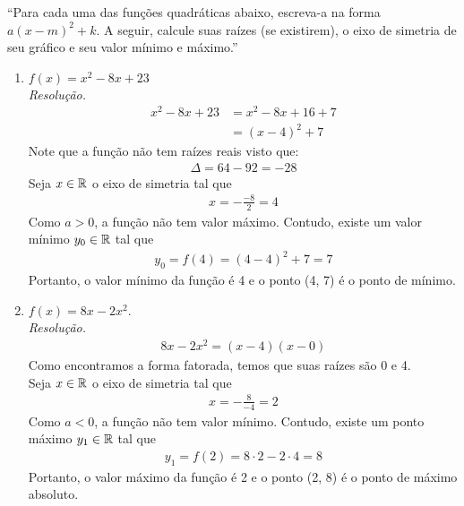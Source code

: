 \enquote{Para cada uma das funções quadráticas abaixo, escreva-a na forma $a(x - m)^2 + k$. A seguir, calcule suas raízes (se existirem), o eixo de simetria de seu gráfico e seu valor mínimo e máximo.}
\begin{enumerate}
    \item $f(x) = x^2 - 8x + 23$ \\
    \emph{Resolução.}
    \begin{align*}
        x^2 - 8x + 23 & = x^2 - 8x + 16 + 7 \\ & =
        (x - 4)^2 + 7
    \end{align*}
    Note que a função não tem raízes reais visto que:
    \begin{align*}
        \Delta = 64 - 92 = -28
    \end{align*}
    Seja $x \in \mathbb R$ o eixo de simetria tal que
    \begin{align*}
        x = -\frac{-8}{2} = 4
    \end{align*}
    Como $a > 0$, a função não tem valor máximo. Contudo, existe um valor mínimo $y_0 \in \mathbb R$ tal que
    \begin{align*}
        y_0 = f(4) = (4 - 4)^2 + 7 = 7
    \end{align*}
    Portanto, o valor mínimo da função é 4 e o ponto (4, 7) é o ponto de mínimo.

    \item $f(x) = 8x - 2x^2$. \\
    \emph{Resolução.}
    \begin{align*}
        8x -2x^2 = (x - 4)(x - 0)
    \end{align*}
    Como encontramos a forma fatorada, temos que suas raízes são 0 e 4. \\
    Seja $x \in \mathbb R$ o eixo de simetria tal que
    \begin{align*}
        x = -\frac{8}{-4} = 2
    \end{align*}
    Como $a < 0$, a função não tem valor mínimo. Contudo, existe um ponto máximo $y_1 \in \mathbb R$ tal que
    \begin{align*}
        y_1 = f(2) = 8 \cdot 2 - 2 \cdot 4 = 8
    \end{align*}
    Portanto, o valor máximo da função é 2 e o ponto (2, 8) é o ponto de máximo absoluto.


\end{enumerate}
